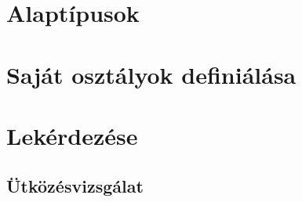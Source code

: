 
\section{Alaptípusok}

\section{Saját osztályok definiálása}

\section{Lekérdezése}

\subsection{Ütközésvizsgálat}